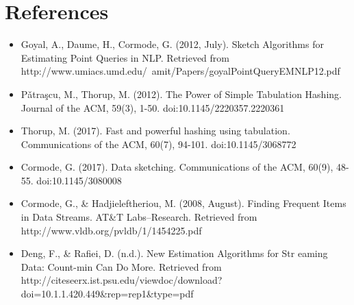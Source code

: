 \documentclass[twoside]{article}
\begin{document}
\section{References}
\begin{itemize}
\item Goyal, A., Daume, H.,  Cormode, G. (2012, July). Sketch Algorithms for Estimating Point Queries in NLP. Retrieved from http://www.umiacs.umd.edu/~amit/Papers/goyalPointQueryEMNLP12.pdf
\item Pǎtraşcu, M.,  Thorup, M. (2012). The Power of Simple Tabulation Hashing. Journal of the ACM, 59(3), 1-50. doi:10.1145/2220357.2220361
\item Thorup, M. (2017). Fast and powerful hashing using tabulation. Communications of the ACM, 60(7), 94-101. doi:10.1145/3068772

\item Cormode, G. (2017). Data sketching. Communications of the ACM, 60(9), 48-55. doi:10.1145/3080008 

\item 
Cormode, G., \& Hadjieleftheriou, M. (2008, August). Finding Frequent Items in Data Streams. AT\&T Labs–Research. Retrieved from http://www.vldb.org/pvldb/1/1454225.pdf
\item

Deng, F., \& Rafiei, D. (n.d.). New Estimation Algorithms for Str eaming Data: Count-min Can Do More. Retrieved from http://citeseerx.ist.psu.edu/viewdoc/download?doi=10.1.1.420.449\&rep=rep1\&type=pdf


\end{itemize}
\end{document}
